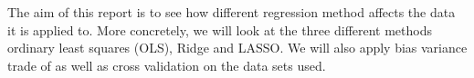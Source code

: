 \thispagestyle{plain}

The aim of this report is to see how different regression method affects the data it is applied to. 
More concretely, we will look at the three different methods ordinary least squares (OLS), Ridge and LASSO. 
We will also apply bias variance trade of as well as cross validation on the data sets used.